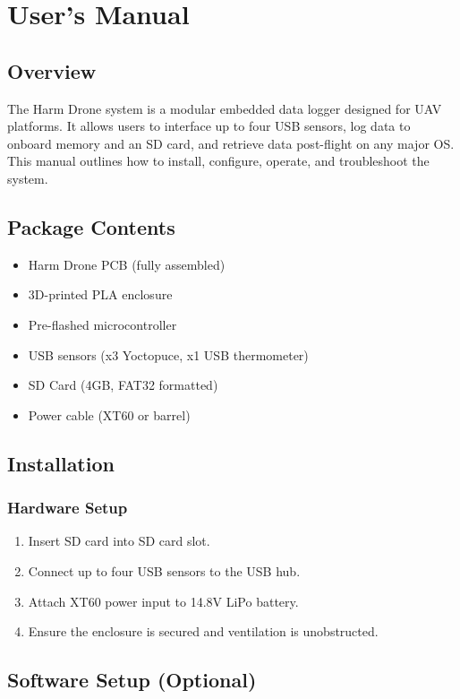 \documentclass[../main.tex]{subfiles}
\begin{document}
\section{User’s Manual}

\subsection{Overview}
The Harm Drone system is a modular embedded data logger designed for UAV platforms. It allows users to interface up to four USB sensors, log data to onboard memory and an SD card, and retrieve data post-flight on any major OS. This manual outlines how to install, configure, operate, and troubleshoot the system.

\subsection{Package Contents}
\begin{itemize}
    \item Harm Drone PCB (fully assembled)
    \item 3D-printed PLA enclosure
    \item Pre-flashed microcontroller
    \item USB sensors (x3 Yoctopuce, x1 USB thermometer)
    \item SD Card (4GB, FAT32 formatted)
    \item Power cable (XT60 or barrel)
\end{itemize}

\subsection{Installation}

\subsubsection{Hardware Setup}
\begin{enumerate}
    \item Insert SD card into SD card slot.
    \item Connect up to four USB sensors to the USB hub.
    \item Attach XT60 power input to 14.8V LiPo battery.
    \item Ensure the enclosure is secured and ventilation is unobstructed.
\end{enumerate}

\subsection{Software Setup (Optional)}
\end{document}
